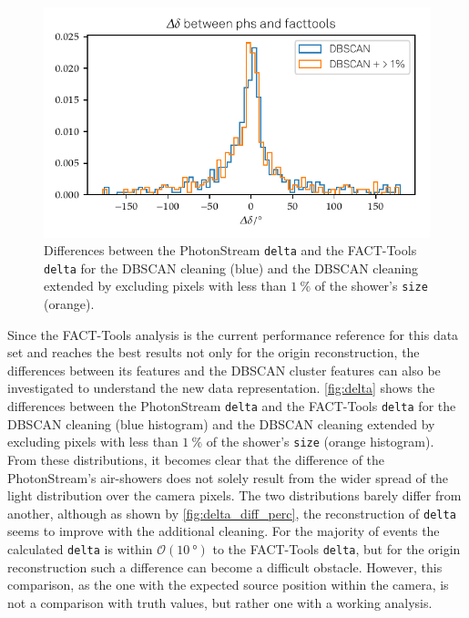 %
\begin{figure}
  \centering
  \includegraphics[width=\textwidth]{Plots/delta_delta/delta_diff_hist_perc_and_normal_DBSCAN_delta_20131104_162.pdf}
  \caption{Differences between the PhotonStream \texttt{delta} and the FACT-Tools \texttt{delta} for the DBSCAN cleaning (blue) and the DBSCAN cleaning extended by excluding pixels with less than $\SI{1}{\percent}$ of the shower's \texttt{size} (orange).}
  \label{fig:delta}
\end{figure}
%
Since the FACT-Tools analysis is the current performance reference for this
data set and reaches the best results not only for the origin reconstruction,
the differences between its features and the DBSCAN cluster
features can also be investigated to understand the new data representation.
\autoref{fig:delta} shows the differences between the PhotonStream
\texttt{delta} and the FACT-Tools \texttt{delta} for the DBSCAN cleaning (blue
histogram) and the DBSCAN cleaning extended by excluding pixels with less
than $\SI{1}{\percent}$ of the shower's \texttt{size} (orange histogram).
From these distributions, it becomes clear that the difference of the
PhotonStream's air-showers does not solely result from the wider spread of
the light distribution over the camera pixels. The two distributions barely
differ from another, although as shown by \autoref{fig:delta_diff_perc}, the
reconstruction of \texttt{delta} seems to improve with the additional
cleaning. For the majority of events the calculated \texttt{delta} is within
$\mathcal{O}(\SI{10}{\degree})$ to the FACT-Tools \texttt{delta}, but for the
origin reconstruction such a difference can become a difficult obstacle.
However, this comparison, as the one with the expected source position
within the camera, is not a comparison with truth values, but rather one
with a working analysis.

